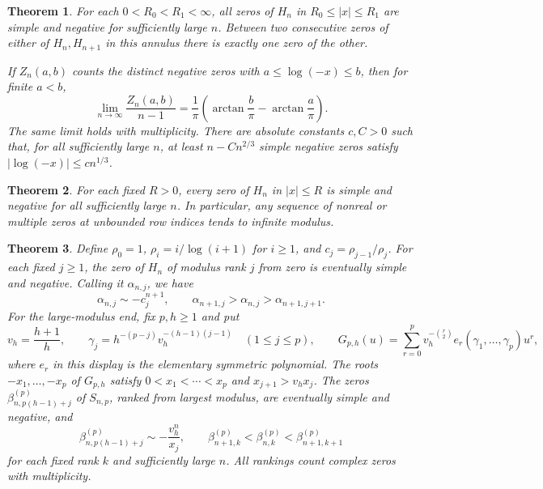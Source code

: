 \documentclass[11pt]{article}
\newtheorem{theorem}{Theorem}
\begin{document}
\begin{theorem}\label{thm:bulk}
For each \(0<R_0<R_1<\infty\), all zeros of \(H_n\) in \(R_0\le |x|\le R_1\) are simple and negative for sufficiently large \(n\). Between two consecutive zeros of either of \(H_n,H_{n+1}\) in this annulus there is exactly one zero of the other.

If \(Z_n(a,b)\) counts the distinct negative zeros with \(a\le\log(-x)\le b\), then for finite \(a<b\),
\begin{equation}\label{eq:cauchy}
 \lim_{n\to\infty}\frac{Z_n(a,b)}{n-1}
 =\frac1\pi\left(\arctan\frac b\pi-\arctan\frac a\pi\right).
\end{equation}
The same limit holds with multiplicity. There are absolute constants \(c,C>0\) such that, for all sufficiently large \(n\), at least \(n-Cn^{2/3}\) simple negative zeros satisfy \(|\log(-x)|\le c n^{1/3}\).
\end{theorem}

\begin{theorem}\label{thm:disk}
For each fixed \(R>0\), every zero of \(H_n\) in \(|x|\le R\) is simple and negative for all sufficiently large \(n\). In particular, any sequence of nonreal or multiple zeros at unbounded row indices tends to infinite modulus.
\end{theorem}

\begin{theorem}\label{thm:extreme}
Define \(\rho_0=1\), \(\rho_i=i/\log(i+1)\) for \(i\ge1\), and \(c_j=\rho_{j-1}/\rho_j\). For each fixed \(j\ge1\), the zero of \(H_n\) of modulus rank \(j\) from zero is eventually simple and negative. Calling it \(\alpha_{n,j}\), we have
\begin{equation}\label{eq:right}
 \alpha_{n,j}\sim -c_j^{n+1},\qquad
 \alpha_{n+1,j}>\alpha_{n,j}>\alpha_{n+1,j+1}.
\end{equation}
For the large-modulus end, fix \(p,h\ge1\) and put
\[
 v_h=\frac{h+1}{h},\qquad
 \gamma_j=h^{-(p-j)}v_h^{-(h-1)(j-1)}\quad(1\le j\le p),\qquad
 G_{p,h}(u)=\sum_{r=0}^p v_h^{-\binom r2}e_r(\gamma_1,\ldots,\gamma_p)u^r,
\]
where \(e_r\) in this display is the elementary symmetric polynomial. The roots \(-x_1,\ldots,-x_p\) of \(G_{p,h}\) satisfy \(0<x_1<\cdots<x_p\) and \(x_{j+1}>v_hx_j\). The zeros \(\beta_{n,p(h-1)+j}^{(p)}\) of \(S_{n,p}\), ranked from largest modulus, are eventually simple and negative, and
\begin{equation}\label{eq:left}
 \beta_{n,p(h-1)+j}^{(p)}\sim-\frac{v_h^n}{x_j},\qquad
 \beta_{n+1,k}^{(p)}<\beta_{n,k}^{(p)}<\beta_{n+1,k+1}^{(p)}
\end{equation}
for each fixed rank \(k\) and sufficiently large \(n\). All rankings count complex zeros with multiplicity.
\end{theorem}
\end{document}
